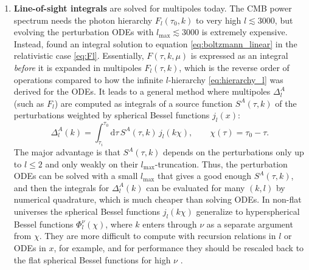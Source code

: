 \documentclass[USenglish, thumbmarks]{uiophdthesis} %
\newcommand\diff{\mathrm{d}}
\newcommand\lmax{{\ensuremath{l_\mathrm{max}}}}
\begin{document}
\begin{enumerate}
\item \textbf{Line-of-sight integrals} are solved for multipoles today.
The CMB power spectrum needs the photon hierarchy $F_l(\tau_0,k)$ to very high $l \lesssim 3000$,
but evolving the perturbation ODEs with $\lmax \lesssim 3000$ is extremely expensive.
Instead, \cite{zaldarriagaAnalyticApproachPolarization1995,seljakLineSightApproach1996}
found an integral solution to equation \eqref{eq:boltzmann_linear} in the relativistic case \eqref{eq:Fl}.
Essentially, $F(\tau, k, \mu)$ is expressed as an integral \emph{before} it is expanded in multipoles $F_l(\tau,k)$,
which is the reverse order of operations compared to how the infinite $l$-hierarchy \eqref{eq:hierarchy_l} was derived for the ODEs.
It leads to a general method where multipoles $\Delta_l^A$ (such as $F_l$)
are computed as integrals of a source function $S^A(\tau,k)$ of the perturbations
weighted by spherical Bessel functions $j_l(x)$:
\begin{equation}
\Delta_l^A(k) = \int_{\tau_i}^{\tau_0} \diff{\tau}\,S^A(\tau,k)\,j_l(k\chi) ,
\qquad \chi(\tau) = \tau_0-\tau .
\label{eq:los}
\end{equation}
The major advantage is that $S^A(\tau,k)$ depends on the perturbations only up to $l \leq 2$
and only weakly on their $\lmax$-truncation.
Thus, the perturbation ODEs can be solved with a small $\lmax$ that gives a good enough $S^A(\tau,k)$,
and then the integrals for $\Delta_l^A(k)$ can be evaluated for many $(k,l)$ by numerical quadrature,
which is much cheaper than solving ODEs.
In non-flat universes the spherical Bessel functions $j_l(k \chi)$ generalize to hyperspherical Bessel functions $\Phi_l^\nu(\chi)$,
where $k$ enters through $\nu$ as a separate argument from $\chi$.
They are more difficult to compute with recursion relations in $l$ or ODEs in $x$, for example,
and for performance they should be rescaled back to the flat spherical Bessel functions for high $\nu$
\cite{lesgourguesFastAccurateCMB2014,thomastramComputationHypersphericalBessel2017,lewisCAMBV2Cosmological2026a}.
\label{eb:los}

\end{enumerate}
\end{document}
